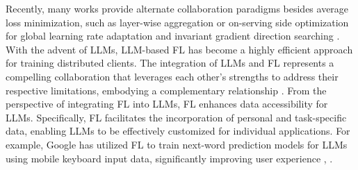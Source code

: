 \documentclass[acmsmall,nonacm]{acmart}
\begin{document}
        Recently, many works provide alternate collaboration paradigms besides average loss minimization, such as layer-wise aggregation \cite{nguyen2024layerwisepersonalizedfederatedlearning} or on-serving side optimization for global learning rate adaptation \cite{jhunjhunwala2023fedexp} and invariant gradient direction searching \cite{anonymous2024federated, anonymous2024domain}. 
        With the advent of LLMs, LLM-based FL has become a highly efficient approach for training distributed clients. The integration of LLMs and FL represents a compelling collaboration that leverages each other's strengths to address their respective limitations, embodying a complementary relationship \cite{zhuang2024foundationmodelmeetsfederated}. 
        From the perspective of integrating FL into LLMs, FL enhances data accessibility for LLMs. Specifically, FL facilitates the incorporation of personal and task-specific data, enabling LLMs to be effectively customized for individual applications. For example, Google has utilized FL to train next-word prediction models for LLMs using mobile keyboard input data, significantly improving user experience \cite{10.1145/3494834.3500240}, \cite{xu-etal-2023-federated}. 
\end{document}

